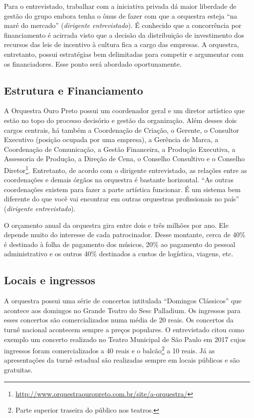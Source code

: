 \documentclass[a4paper, 12pt, openright, oneside, german, french, english, brazil]{abntex2}
\begin{document}
	Para o entrevistado, trabalhar com a iniciativa privada dá maior liberdade de gestão do grupo embora tenha o ônus de fazer com que a orquestra esteja ``na maré do mercado'' (\textit{dirigente entrevistado}). É conhecido que a concorrência por financiamento é acirrada visto que a decisão da distribuição de investimento dos recursos das leis de incentivo à cultura fica a cargo das empresas. A orquestra, entretanto, possui estratégias bem delimitadas para competir e argumentar com os financiadores. Esse ponto será abordado oportunamente.
	
	\subsection{Estrutura e Financiamento}
	
	A Orquestra Ouro Preto possui um coordenador geral e um diretor artístico que estão no topo do processo decisório e gestão da organização. Além desses dois cargos centrais, há também a Coordenação de Criação, o Gerente, o Consultor Executivo (posição ocupada por uma empresa), a Gerência de Marca, a Coordenação de Comunicação, a Gestão Financeira, a Produção Executiva, a Assessoria de Produção, a Direção de Cena, o Conselho Consultivo e o Conselho Diretor\footnote{\url{http://www.orquestraouropreto.com.br/site/a-orquestra/}}. Entretanto, de acordo com o dirigente entrevistado, as relações entre as coordenações e demais órgãos na orquestra é bastante horizontal. ``As outras coordenações existem para fazer a parte artística funcionar. É um sistema bem diferente do que você vai encontrar em outras orquestras profissionais no país'' (\textit{dirigente entrevistado}). 
	
	O orçamento anual da orquestra gira entre dois e três milhões por ano. Ele depende muito do interesse de cada patrocinador. Desse montante, cerca de 40\% é destinado à folha de pagamento dos músicos, 20\% ao pagamento do pessoal administrativo e os outros 40\% destinados a custos de logística, viagens, etc.
	
	\subsection{Locais e ingressos}
	
	A orquestra possui uma série de concertos intitulada ``Domingos Clássicos'' que acontece aos domingos no Grande Teatro do Sesc Palladium. Os ingressos para esses concertos são comercializados numa média de 20 reais. Os concertos da turnê nacional acontecem sempre a preços populares. O entrevistado citou como exemplo um concerto realizado no Teatro Municipal de São Paulo em 2017 cujos ingressos foram comercializados a 40 reais e o balcão\footnote{Parte superior traseira do público nos teatros.} a 10 reais. Já as apresentações da turnê estadual são realizadas sempre em locais públicos e são gratuitas.
	
\end{document}
